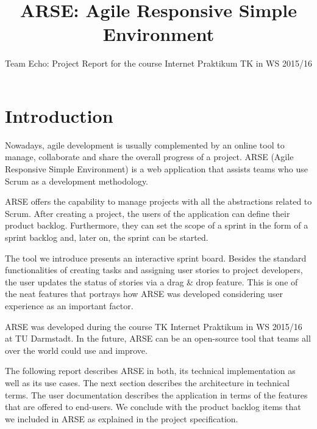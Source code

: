 \documentclass[
	accentcolor=tud1a %
]{tudreport}
\begin{document}
\title{ARSE: Agile Responsive Simple Environment}
\subtitle{Team Echo: Project Report for the course Internet Praktikum TK in WS 2015/16}

\maketitle

\tableofcontents

\chapter{Introduction}
\label{ch:introduction}

Nowadays, agile development is usually complemented by an online tool to manage, collaborate and share the overall progress of a project. ARSE (Agile Responsive Simple Environment) is a web application that assists teams who use Scrum as a development methodology. 

ARSE offers the capability to manage projects with all the abstractions related to Scrum. After creating a project, the users of the application can define their product backlog. Furthermore, they can set the scope of a sprint in the form of a sprint backlog and, later on, the sprint can be started. 

The tool we introduce presents an interactive sprint board. Besides the standard functionalities of creating tasks and assigning user stories to project developers, the user updates the status of stories via a drag \& drop feature. This is one of the neat features that portrays how ARSE was developed considering user experience as an important factor.

ARSE was developed during the course TK Internet Praktikum in WS 2015/16 at TU Darmstadt. In the future, ARSE can be an open-source tool that teams all over the world could use and improve. 

The following report describes ARSE in both, its technical implementation as well as its use cases. The next section describes the architecture in technical terms. The user documentation describes the application in terms of the features that are offered to end-users. We conclude with the product backlog items that we included in ARSE as explained in the project specification. 
\end{document}

